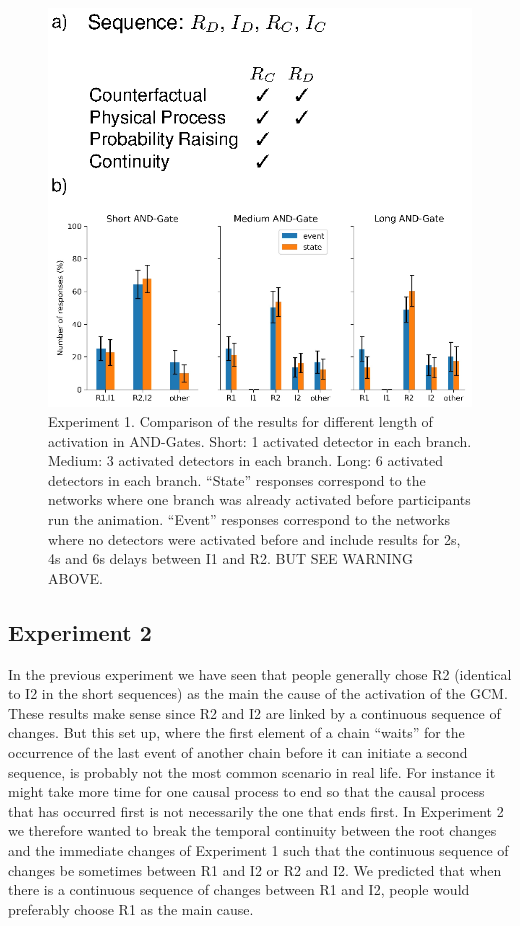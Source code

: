 \documentclass[10pt,letterpaper]{article}
\begin{document}
\begin{figure}[ht]
\begin{center}
\includegraphics{figures/expt1.eps}
\end{center}
\caption{Experiment 1. Comparison of the results for different length of activation in AND-Gates. Short: 1 activated detector in each branch. Medium: 3 activated detectors in each branch. Long: 6 activated detectors in each branch. ``State'' responses correspond to the networks where one branch was already activated before participants run the animation. ``Event'' responses correspond to the networks where no detectors were activated before and include results for 2s, 4s and 6s delays between I1 and R2. BUT SEE WARNING ABOVE.} 
\label{fig:2}
\end{figure}

\subsection{Experiment 2}

In the previous experiment we have seen that people generally chose R2 (identical to I2 in the short sequences) as the main the cause of the activation of the GCM. These results make sense since R2 and I2 are linked by a continuous sequence of changes. But this set up, where the first element of a chain ``waits'' for the occurrence of the last event of another chain before it can initiate a second sequence, is probably not the most common scenario in real life. For instance it might take more time for one causal process to end so that the causal process that has occurred first is not necessarily the one that ends first. In Experiment 2 we therefore wanted to break the temporal continuity between the root changes and the immediate changes of Experiment 1 such that the continuous sequence of changes be sometimes between R1 and I2 or R2 and I2. We predicted that when there is a continuous sequence of changes between R1 and I2, people would preferably choose R1 as the main cause.
\end{document}
